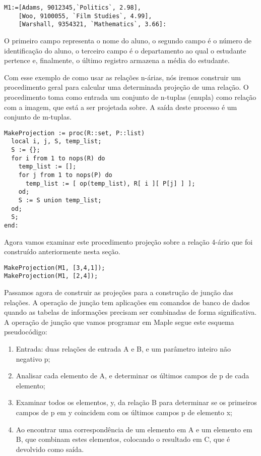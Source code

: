 \documentclass[a4paper]{article}
\begin{document}
\begin{lstlisting}
M1:=[Adams, 9012345,`Politics`, 2.98],
    [Woo, 9100055, `Film Studies`, 4.99],
    [Warshall, 9354321, `Mathematics`, 3.66]:
\end{lstlisting}

O primeiro campo representa o nome do aluno, o segundo campo é o número de identificação do aluno, o terceiro campo é o departamento ao qual o estudante pertence e, finalmente, o último registro armazena a média do estudante.

Com esse exemplo de como usar as relações n-árias, nós iremos construir um procedimento geral para calcular uma determinada projeção de uma relação. O procedimento toma como entrada um conjunto de n-tuplas (enupla) como relação com a imagem, que está a ser projetada sobre. A saída deste processo é um conjunto de m-tuplas.

\begin{lstlisting}
MakeProjection := proc(R::set, P::list)
  local i, j, S, temp_list;
  S := {};
  for i from 1 to nops(R) do
    temp_list := [];
    for j from 1 to nops(P) do
      temp_list := [ op(temp_list), R[ i ][ P[j] ] ];
    od;
    S := S union temp_list;
  od;
  S;
end:
\end{lstlisting}

Agora vamos examinar este procedimento projeção sobre a relação 4-ário que foi construído anteriormente nesta seção.

\begin{lstlisting}
MakeProjection(M1, [3,4,1]);
MakeProjection(M1, [2,4]);
\end{lstlisting}

Passamos agora de construir as projeções para a construção de junção das relações. A operação de junção tem aplicações em comandos de banco de dados quando as tabelas de informações precisam ser combinadas de forma significativa. A operação de junção que vamos programar em Maple segue este esquema pseudocódigo:

\begin{enumerate}
\item{Entrada: duas relações de entrada A e B, e um parâmetro inteiro não negativo p;} 
\item{Analisar cada elemento de A, e determinar os últimos campos de p de cada elemento;}
\item{Examinar todos os elementos, y, da relação B para determinar se os primeiros campos de p em y coincidem com os últimos campos p de elemento x;}
\item{Ao encontrar uma correspondência de um elemento em A e um elemento em B, que combinam estes elementos, colocando o resultado em C, que é devolvido como saída.}
\end{enumerate}
\end{document}
